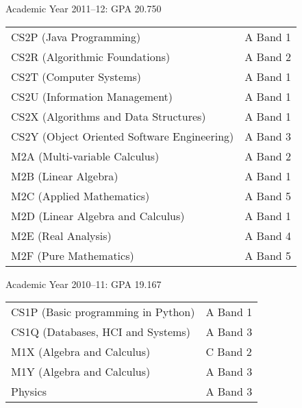 \documentclass[10pt,a4paper]{article}
\begin{document}
Academic Year 2011--12: GPA 20.750

\begin{tabular}{p{10cm}l}
    CS2P (Java Programming) & A Band 1\\
    CS2R (Algorithmic Foundations) & A Band 2\\
    CS2T (Computer Systems) & A Band 1\\
    CS2U (Information Management) & A Band 1\\
    CS2X (Algorithms and Data Structures) & A Band 1\\
    CS2Y (Object Oriented Software Engineering) & A Band 3\\
    M2A (Multi-variable Calculus) & A Band 2\\
    M2B (Linear Algebra) & A Band 1\\
    M2C (Applied Mathematics) & A Band 5\\
    M2D (Linear Algebra and Calculus) & A Band 1\\
    M2E (Real Analysis) & A Band 4\\
    M2F (Pure Mathematics) & A Band 5\\
\end{tabular}

Academic Year 2010--11: GPA 19.167

\begin{tabular}{p{10cm}l}
    CS1P (Basic programming in Python) & A Band 1\\
    CS1Q (Databases, HCI and Systems) & A Band 3\\
    M1X (Algebra and Calculus) & C Band 2\\
    M1Y (Algebra and Calculus) & A Band 3\\
    Physics & A Band 3\\
\end{tabular}
\end{document}
